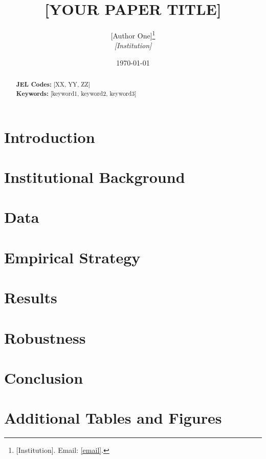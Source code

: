 \documentclass[12pt]{article}
\title{[YOUR PAPER TITLE]}
\author{
  [Author One]\thanks{[Institution]. Email: \href{mailto:[email]}{[email]}.} \\
  \textit{[Institution]}
}
\date{\today}
\begin{document}

\maketitle

\begin{abstract}

\medskip
\noindent\textbf{JEL Codes:} [XX, YY, ZZ] \\
\noindent\textbf{Keywords:} [keyword1, keyword2, keyword3]
\end{abstract}

\newpage

\section{Introduction}
\label{sec:introduction}

\section{Institutional Background}
\label{sec:background}

\section{Data}
\label{sec:data}

\section{Empirical Strategy}
\label{sec:empirical_strategy}

\section{Results}
\label{sec:results}

\section{Robustness}
\label{sec:robustness}

\section{Conclusion}
\label{sec:conclusion}

\newpage


\newpage
\appendix
\section{Additional Tables and Figures}
\label{sec:appendix}

\end{document}
